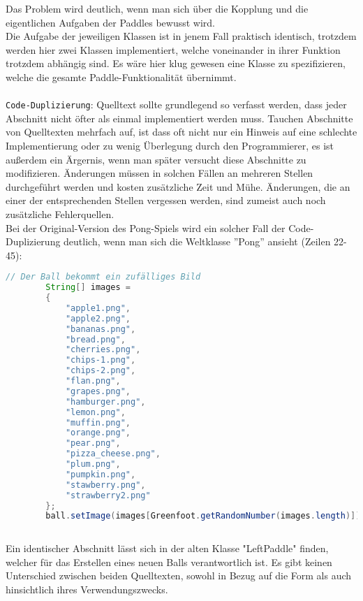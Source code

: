 \documentclass{pi1}
\begin{document}
Das Problem wird deutlich, wenn man sich über die Kopplung und die eigentlichen Aufgaben der Paddles bewusst wird.\\
Die Aufgabe der jeweiligen Klassen ist in jenem Fall praktisch identisch, trotzdem werden hier zwei Klassen implementiert, welche voneinander in ihrer Funktion trotzdem abhängig sind.
Es wäre hier klug gewesen eine Klasse zu spezifizieren, welche die gesamte Paddle-Funktionalität übernimmt.\\
\\
\texttt{Code-Duplizierung}:
Quelltext sollte grundlegend so verfasst werden, dass jeder Abschnitt nicht öfter als einmal implementiert werden muss. Tauchen Abschnitte von Quelltexten mehrfach auf, ist dass oft nicht nur ein Hinweis auf eine schlechte Implementierung oder zu wenig Überlegung durch den Programmierer, es ist außerdem ein Ärgernis, wenn man später versucht diese Abschnitte zu modifizieren. Änderungen müssen in solchen Fällen an mehreren Stellen durchgeführt werden und kosten zusätzliche Zeit und Mühe.
Änderungen, die an einer der entsprechenden Stellen vergessen werden, sind zumeist auch noch zusätzliche Fehlerquellen.\\
Bei der Original-Version des Pong-Spiels wird ein solcher Fall der Code-Duplizierung deutlich, wenn man sich die Weltklasse ''Pong'' ansieht (Zeilen 22-45):
\begin{lstlisting}[caption={ Ausschnitt der Pong() Methode der Klasse Pong}, firstnumber=22, language=Java]
        // Der Ball bekommt ein zufälliges Bild
        String[] images =
        {
            "apple1.png",
            "apple2.png",
            "bananas.png",
            "bread.png",
            "cherries.png",
            "chips-1.png",
            "chips-2.png",
            "flan.png",
            "grapes.png",
            "hamburger.png",
            "lemon.png",
            "muffin.png",
            "orange.png",
            "pear.png",
            "pizza_cheese.png",
            "plum.png",
            "pumpkin.png",
            "stawberry.png",
            "strawberry2.png"
        };
        ball.setImage(images[Greenfoot.getRandomNumber(images.length)]);
    
\end{lstlisting}
Ein identischer Abschnitt lässt sich in der alten Klasse "LeftPaddle" finden, welcher für das Erstellen eines neuen Balls verantwortlich ist.
Es gibt keinen Unterschied zwischen beiden Quelltexten, sowohl in Bezug auf die Form als auch hinsichtlich ihres Verwendungszwecks.\\
\end{document}
